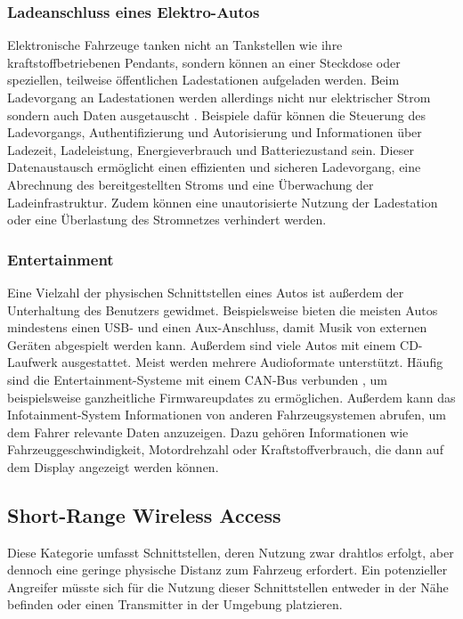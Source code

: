 \subsubsection{Ladeanschluss eines Elektro-Autos}
Elektronische Fahrzeuge tanken nicht an Tankstellen wie ihre kraftstoffbetriebenen Pendants, sondern können an einer Steckdose oder speziellen, teilweise öffentlichen Ladestationen aufgeladen werden. Beim Ladevorgang an Ladestationen werden allerdings nicht nur elektrischer Strom sondern auch Daten ausgetauscht \cite[3]{Checkoway.2011}. Beispiele dafür können die Steuerung des Ladevorgangs, Authentifizierung und Autorisierung und Informationen über Ladezeit, Ladeleistung, Energieverbrauch und Batteriezustand sein. Dieser Datenaustausch ermöglicht einen effizienten und sicheren Ladevorgang, eine Abrechnung des bereitgestellten Stroms und eine Überwachung der Ladeinfrastruktur. Zudem können eine unautorisierte Nutzung der Ladestation oder eine Überlastung des Stromnetzes verhindert werden. 

\subsubsection{Entertainment}
Eine Vielzahl der physischen Schnittstellen eines Autos ist außerdem der Unterhaltung des Benutzers gewidmet. Beispielsweise bieten die meisten Autos mindestens einen USB- und einen Aux-Anschluss, damit Musik von externen Geräten abgespielt werden kann. Außerdem sind viele Autos mit einem CD-Laufwerk ausgestattet. Meist werden mehrere Audioformate unterstützt. Häufig sind die Entertainment-Systeme mit einem \acs{CAN}-Bus verbunden \cite[4]{Checkoway.2011}, um beispielsweise ganzheitliche Firmwareupdates zu ermöglichen. Außerdem kann das Infotainment-System Informationen von anderen Fahrzeugsystemen abrufen, um dem Fahrer relevante Daten anzuzeigen. Dazu gehören Informationen wie Fahrzeuggeschwindigkeit, Motordrehzahl oder Kraftstoffverbrauch, die dann auf dem Display angezeigt werden können.

\subsection{Short-Range Wireless Access}
Diese Kategorie umfasst Schnittstellen, deren Nutzung zwar drahtlos erfolgt, aber dennoch eine geringe physische Distanz zum Fahrzeug erfordert. Ein potenzieller Angreifer müsste sich für die Nutzung dieser Schnittstellen entweder in der Nähe befinden oder einen Transmitter in der Umgebung platzieren.


